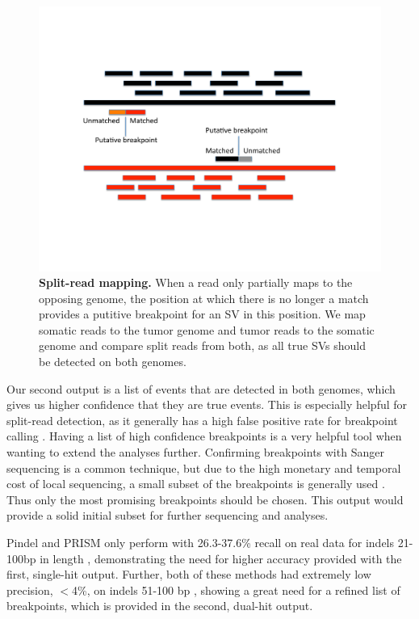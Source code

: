 \documentclass{easychithesis}
\begin{document}
\begin{figure}[!ht]
\begin{center}
\includegraphics[width = 0.95  \linewidth]{../Code/Figures/SplitReadMapping.pdf}
\end{center}
\caption{{\bf Split-read mapping.}  When a read only partially maps to the opposing genome, the position at which there is no longer a match provides a putitive breakpoint for an SV in this position. We map somatic reads to the tumor genome and tumor reads to the somatic genome and compare split reads from both, as all true SVs should be detected on both genomes.}
\label{fig:SplitReadMapping}
\end{figure}

Our second output is a list of events that are detected in both genomes, which gives us higher confidence that they are true events. This is especially helpful for split-read detection, as it generally has a high false positive rate for breakpoint calling \cite{abel2013detection}. Having a list of high confidence breakpoints is a very helpful tool when wanting to extend the analyses further. Confirming breakpoints with Sanger sequencing is a common technique, but due to the high monetary and temporal cost of local sequencing, a small subset of the breakpoints is generally used \cite{jiang2012prism}. Thus only the most promising breakpoints should be chosen. This output would provide a solid initial subset for further sequencing and analyses.

Pindel and PRISM only perform with 26.3-37.6\% recall on real data for indels 21-100bp in length \cite{jiang2012prism}, demonstrating the need for higher accuracy provided with the first, single-hit output. Further, both of these methods had extremely low precision, $<$4\%, on indels 51-100 bp \cite{jiang2012prism}, showing a great need for a refined list of breakpoints, which is provided in the second, dual-hit output.
\end{document}
